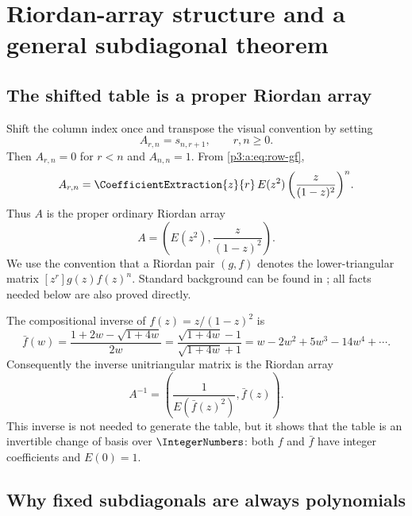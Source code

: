 \documentclass[11pt,oneside]{article}
\numberwithin{equation}{section}
\theoremstyle{definition}
\theoremstyle{remark}
\begin{document}
\section{Riordan-array structure and a general subdiagonal theorem}
\label{p3:b:sec:riordan}\label{p3:ch:riordan}

\subsection{The shifted table is a proper Riordan array}

Shift the column index once and transpose the visual convention by setting
\begin{equation}
 A_{r,n}=s_{n,r+1},
 \qquad r,n\ge0.
 \label{p3:b:eq:A-definition}
\end{equation}
Then $A_{r,n}=0$ for $r<n$ and $A_{n,n}=1$.  From
\eqref{p3:a:eq:row-gf},
\begin{equation}
 A_{r,n}
 =\CoefficientExtraction{z}{r}\,{E(z^2)\left(\frac{z}{(1-z)^2}\right)^n}.
 \label{p3:b:eq:riordan-entry}
\end{equation}
Thus $A$ is the proper ordinary Riordan array
\begin{equation}
 A=\left(E(z^2),\frac{z}{(1-z)^2}\right).
 \label{p3:b:eq:riordan-pair}
\end{equation}
We use the convention that a Riordan pair $(g,f)$ denotes the lower-triangular
matrix $[z^r]g(z)f(z)^n$.  Standard background can be found in
\cite{p3:shapiro,p3:sprugnoli}; all facts needed below are also proved
directly.

The compositional inverse of
$f(z)=z/(1-z)^2$ is
\begin{equation}
 \bar f(w)
 =\frac{1+2w-\sqrt{1+4w}}{2w}
 =\frac{\sqrt{1+4w}-1}{\sqrt{1+4w}+1}
 =w-2w^2+5w^3-14w^4+\cdots.
 \label{p3:b:eq:f-inverse}
\end{equation}
Consequently the inverse unitriangular matrix is the Riordan array
\begin{equation}
 A^{-1}
 =\left(\frac{1}{E(\bar f(z)^2)},\bar f(z)\right).
 \label{p3:b:eq:riordan-inverse}
\end{equation}
This inverse is not needed to generate the table, but it shows that the table
is an invertible change of basis over $\IntegerNumbers$: both $f$ and $\bar f$ have
integer coefficients and $E(0)=1$.

\subsection{Why fixed subdiagonals are always polynomials}
\end{document}
